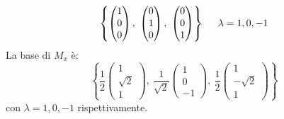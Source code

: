 \documentclass[11pt, a4paper]{scrartcl} %
\numberwithin{equation}{section}
\theoremstyle{style2}
\theoremstyle{style1}
\begin{document}
\begin{multicols}{2}
\begin{itemize}
				\begin{equation}
					\left\{ \begin{pmatrix} 1 \\ 0 \\ 0 \end{pmatrix} ,\ \begin{pmatrix} 0 \\ 1 \\ 0 \end{pmatrix} ,\ \begin{pmatrix} 0\\ 0\\ 1 \end{pmatrix} \right\}  \hspace{.5cm} \lambda = 1,0,-1
				\end{equation}
				La base di $M_x$ \`e:
				\begin{equation}
					\left\{ \frac{1}{2}\begin{pmatrix} 1 \\ \sqrt{2} \\1 \end{pmatrix} , \ \frac{1}{\sqrt{2} } \begin{pmatrix} 1 \\0 \\ -1 \end{pmatrix} , \ \frac{1}{2}\begin{pmatrix} 1 \\ -\sqrt{2} \\ 1 \end{pmatrix}  \right\} 
				\end{equation}
				con $\lambda = 1,0,-1$ rispettivamente.


\end{itemize}
\end{multicols}
\end{document}
